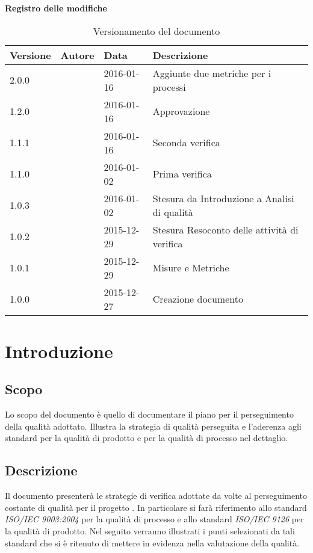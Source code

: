 \documentclass[12pt,a4paper]{article}
\begin{document}
\Large{\textbf{Registro delle modifiche}}\\
\normalsize

\begin{table}[h]
\begin{center}

\begin{tabular}{p{} p{} p{} p{}}
\toprule
\textbf{Versione}	&	\textbf{Autore}	&	\textbf{Data}	&	\textbf{Descrizione}\\
\midrule
\midrule
2.0.0 & \AVI{} & 2016-01-16 & Aggiunte due metriche per i processi \\
\midrule
1.2.0 & \IB{} & 2016-01-16 & Approvazione \\
\midrule
1.1.1 & \AVE{} & 2016-01-16 & Seconda verifica \\
\midrule
1.1.0 & \NDC{} & 2016-01-02 & Prima verifica \\
\midrule
1.0.3 & \AB{} & 2016-01-02 &  Stesura da Introduzione a Analisi di qualità\\
\midrule
1.0.2 & \WS{} & 2015-12-29 &  Stesura Resoconto delle attività di verifica\\
\midrule
1.0.1 & \AVI{} & 2015-12-29 &  Misure e Metriche \\
\midrule
1.0.0 & \IB{} & 2015-12-27 &  Creazione documento \\
\bottomrule
\end{tabular}
\caption{Versionamento del documento}
\label{tabVers1}
\end{center}
\end{table}

\newpage
\tableofcontents
\newpage

\listoftables
\listoffigures
\newpage

\section{Introduzione}
\subsection{Scopo}
Lo scopo del documento è quello di documentare il piano per il perseguimento della qualità adottato. Illustra la strategia di qualità perseguita e l'aderenza agli standard per la qualità di prodotto e per la qualità di processo nel dettaglio. 

\subsection{Descrizione}
Il documento presenterà  le strategie di verifica adottate da \nomeGruppo{} volte al
perseguimento costante di  qualità per il progetto \prjL{}.
In particolare si farà riferimento allo standard \textit{ISO/IEC 9003:2004} per la qualità di processo e allo standard \textit{ISO/IEC 9126} per la qualità di prodotto. Nel seguito verranno illustrati i punti selezionati da tali standard che si è ritenuto di mettere in evidenza nella valutazione della qualità.
\end{document}
